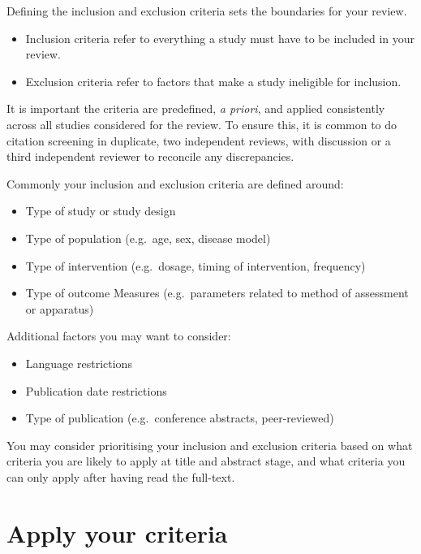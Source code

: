 \documentclass[
]{book}
\providecommand{\tightlist}{%
  \setlength{\itemsep}{0pt}\setlength{\parskip}{0pt}}
\begin{document}
Defining the inclusion and exclusion criteria sets the boundaries for your review.

\begin{itemize}
\tightlist
\item
  Inclusion criteria refer to everything a study must have to be included in your review.
\item
  Exclusion criteria refer to factors that make a study ineligible for inclusion.
\end{itemize}

It is important the criteria are predefined, \emph{a priori}, and applied consistently across all studies considered for the review. To ensure this, it is common to do citation screening in duplicate, two independent reviews, with discussion or a third independent reviewer to reconcile any discrepancies.

Commonly your inclusion and exclusion criteria are defined around:

\begin{itemize}
\tightlist
\item
  Type of study or study design
\item
  Type of population (e.g.~age, sex, disease model)
\item
  Type of intervention (e.g.~dosage, timing of intervention, frequency)
\item
  Type of outcome Measures (e.g.~parameters related to method of assessment or apparatus)
\end{itemize}

Additional factors you may want to consider:

\begin{itemize}
\tightlist
\item
  Language restrictions
\item
  Publication date restrictions
\item
  Type of publication (e.g.~conference abstracts, peer-reviewed)
\end{itemize}

You may consider prioritising your inclusion and exclusion criteria based on what criteria you are likely to apply at title and abstract stage, and what criteria you can only apply after having read the full-text.

\hypertarget{apply-your-criteria}{%
\section{Apply your criteria}\label{apply-your-criteria}}
\end{document}
